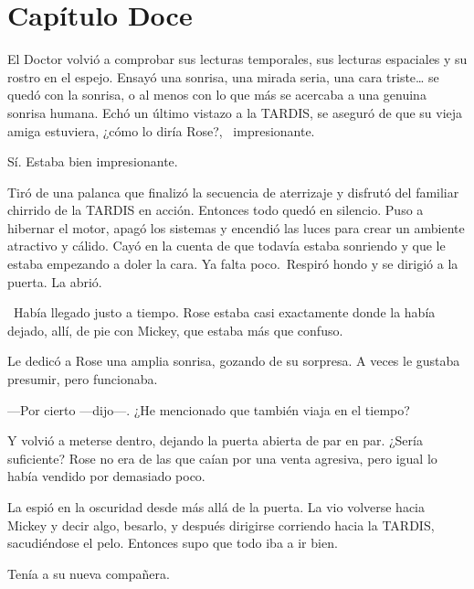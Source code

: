 \chapter*{Capítulo Doce}


El Doctor volvió a comprobar sus lecturas temporales, sus lecturas
espaciales y su rostro en el espejo. Ensayó una sonrisa, una mirada
seria, una cara triste\ldots{} se quedó con la sonrisa, o al menos con
lo que más se acercaba a una genuina sonrisa humana. Echó un último
vistazo a la TARDIS, se aseguró de que su vieja amiga estuviera, ¿cómo
lo diría Rose?, ~impresionante.

Sí. Estaba bien impresionante.

Tiró de una palanca que finalizó la secuencia de aterrizaje y disfrutó
del familiar chirrido de la TARDIS en acción. Entonces todo quedó en
silencio. Puso a hibernar el motor, apagó los sistemas y encendió las
luces para crear un ambiente atractivo y cálido. Cayó en la cuenta de
que todavía estaba sonriendo y que le estaba empezando a doler la cara.
Ya falta poco.~Respiró hondo y se dirigió a la puerta. La abrió.

~Había llegado justo a tiempo. Rose estaba casi exactamente donde la
había dejado, allí, de pie con Mickey, que estaba más que confuso.

Le dedicó a Rose una amplia sonrisa, gozando de su sorpresa. A veces le
gustaba presumir, pero funcionaba.

---Por cierto ---dijo---. ¿He mencionado que también viaja en el tiempo?

Y volvió a meterse dentro, dejando la puerta abierta de par en par.
¿Sería suficiente? Rose no era de las que caían por una venta agresiva,
pero igual lo había vendido por demasiado poco.

La espió en la oscuridad desde más allá de la puerta. La vio volverse
hacia Mickey y decir algo, besarlo, y después dirigirse corriendo hacia
la TARDIS, sacudiéndose el pelo. Entonces supo que todo iba a ir bien.

Tenía a su nueva compañera.